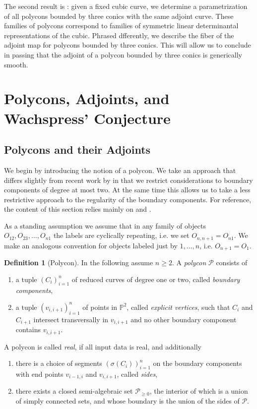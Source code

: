 \documentclass[a4paper,10pt]{amsart}
\theoremstyle{definition}
\newtheorem{defin}{Definition}[section]
\theoremstyle{plain}
\newcommand{\cP}{{\mathcal P}}
\newcommand{\pp}{\mathbb{P}}
\begin{document}
The second result is : given a fixed cubic curve, we determine a parametrization of all polycons bounded by three conics with the same adjoint curve. These families of polycons correspond to families of symmetric linear determinantal representations of the cubic. Phrased dfferently, we describe the fiber of the adjoint map for polycons bounded by three conics. This will allow us to conclude in passing that the adjoint of a polycon bounded by three conics is generically smooth.


\section{Polycons, Adjoints, and Wachspress' Conjecture} \label{sec:PrelimPolycon}

\subsection{Polycons and their Adjoints}

We begin by introducing the notion of a polycon. We take an approach that differs slightly from recent work by \cite{KohnEtAl2024AdjCurves} in that we restrict considerations to boundary components of degree at most two. At the same time this allows us to take a less restrictive approach to the regularity of the boundary components. For reference, the content of this section relies mainly on \cite{Wachspress2016Adjoints} and \cite{KohnEtAl2024AdjCurves}.

As a standing assumption we assume that in any family of objects $O_{12}, O_{23}, \dots, O_{n1}$ the labels are cyclically repeating, i.e. we set $O_{n,n+1} = O_{n1}$. We make an analogous convention for objects labeled just by $1, \dots, n$, i.e. $O_{n+1} = O_1$.

\begin{defin}[Polycon]
 In the following assume $n \geq 2$. A \emph{polycon} $\cP$ consists of
 \begin{enumerate}
     \item a tuple $(C_i)_{i=1}^n$ of reduced curves of degree one or two, called \emph{boundary components},
     \item a tuple $(v_{i,i+1})_{i=1}^n$ of points in $\pp^2$, called \emph{explicit vertices}, such that $C_i$ and $C_{i+1}$ intersect transversally in $v_{i,i+1}$ and no other boundary component contains $v_{i,i+1}$.
 \end{enumerate}
 A polycon is called \emph{real}, if all input data is real, and additionally
 \begin{enumerate}
     \item there is a choice of segments $(\sigma(C_i))_{i=1}^n$ on the boundary components with end points $v_{i-1,i}$ and $v_{i,i+1}$, called \emph{sides},
     \item there exists a closed semi-algebraic set $\cP_{\geq0}$, the interior of which is a union of simply connected sets, and whose boundary is the union of the sides of $\cP$.
 \end{enumerate}
\end{defin}
\end{document}
